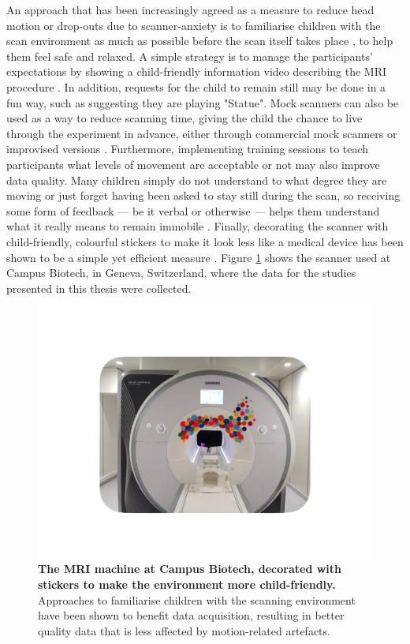 An approach that has been increasingly agreed as a measure to reduce head motion or drop-outs due to scanner-anxiety is to familiarise children with the scan environment as much as possible before the scan itself takes place \citep{Greene2016}, to help them feel safe and relaxed. A simple strategy is to manage the participants' expectations by showing a child-friendly information video describing the MRI procedure \citep{Thomason2009}. In addition, requests for the child to remain still may be done in a fun way, such as suggesting they are playing "Statue". Mock scanners can also be used as a way to reduce scanning time, giving the child the chance to live through the experiment in advance, either through commercial mock scanners or improvised versions \citep{DeBie2010,Barnea-Goraly2014}. Furthermore, implementing training sessions to teach participants what levels of movement are acceptable or not may also improve data quality. Many children simply do not understand to what degree they are moving or just forget having been asked to stay still during the scan, so receiving some form of feedback --- be it verbal or otherwise --- helps them understand what it really means to remain immobile \citep{DeBie2010}. Finally, decorating the scanner with child-friendly, colourful stickers to make it look less like a medical device has been shown to be a simple yet efficient measure \citep{Nordahl2016}. Figure \ref{fig:MRI} shows the scanner used at Campus Biotech, in Geneva, Switzerland, where the data for the studies presented in this thesis were collected.



\begin{figure}[h!]
\centering\includegraphics[width=1\linewidth]{images/Ch2/Ch2_MRI.pdf}
\caption{\textbf{The MRI machine at Campus Biotech, decorated with stickers to make the environment more child-friendly.} Approaches to familiarise children with the scanning environment have been shown to benefit data acquisition, resulting in better quality data that is less affected by motion-related artefacts.} \label{fig:MRI}
\end{figure}




